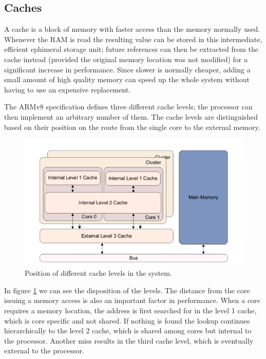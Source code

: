 \documentclass[12pt,a4paper,openright,twoside]{report}
\begin{document}
\subsection{Caches}
\label{cache}
A cache is a block of memory with faster access than the memory normally used.
Whenever the RAM is read the resulting value can be stored in this intermediate,
efficient ephimeral storage unit; future references can then be extracted from 
the cache instead (provided the original memory location was not modified) for
a significant increase in performance.
Since slower is normally cheaper, adding a small amount of high quality memory can
speed up the whole system without having to use an expensive replacement.

The ARMv8 specification defines three different cache levels; the processor can
then implement an arbitrary number of them. The cache levels are distinguished 
based on their position on the route from the single core to the external memory.

 \begin{figure}[t]
 \includegraphics[scale=0.6]{images/tesi12.png} 
 \caption[Cache Levels]{Position of different cache levels in the system.}\label{fig:cache}
 \end{figure}

 In figure \ref{fig:cache} we can see the disposition of the levels. The distance
 from the core issuing a memory access is also an important factor in performance.
When a core requires a memory location, the address is first searched for in 
the level 1 cache, which is core specific and not shared. If nothing is found 
the lookup continues hierarchically to the level 2 cache, which is shared among
cores but internal to the processor. Another miss results in the third cache level,
which is eventually external to the processor.
\end{document}
